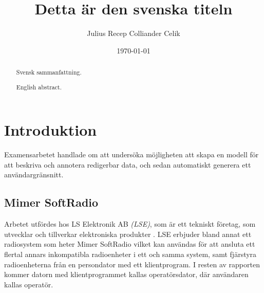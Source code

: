 \documentclass[swedish]{kththesis}
\begin{document}
\title{Detta är den svenska titeln}
\author{Julius Recep Colliander Celik}
\date{\today}

\frontmatter

\titlepage

\begin{abstract}
  Svensk sammanfattning.

\end{abstract}


\begin{otherlanguage}{english}
  \begin{abstract}
    English abstract.

  \end{abstract}
\end{otherlanguage}


\tableofcontents


\mainmatter


\chapter{Introduktion}
Examensarbetet handlade om att undersöka möjligheten att skapa en modell för att beskriva och annotera redigerbar data, och sedan automatiskt generera ett användargränsnitt. 


\section{Mimer SoftRadio}
Arbetet utfördes hos LS Elektronik AB \textit{(LSE)}, som är ett tekniskt företag, som utvecklar och tillverkar elektroniska produkter \cite{Ehne}. LSE erbjuder bland annat ett radiosystem som heter Mimer SoftRadio vilket kan användas för att ansluta ett flertal annars inkompatibla radioenheter i ett och samma system, samt fjärstyra radioenheterna från en persondator med ett klientprogram. I resten av rapporten kommer datorn med klientprogrammet kallas operatörsdator, där användaren kallas operatör.
\end{document}
